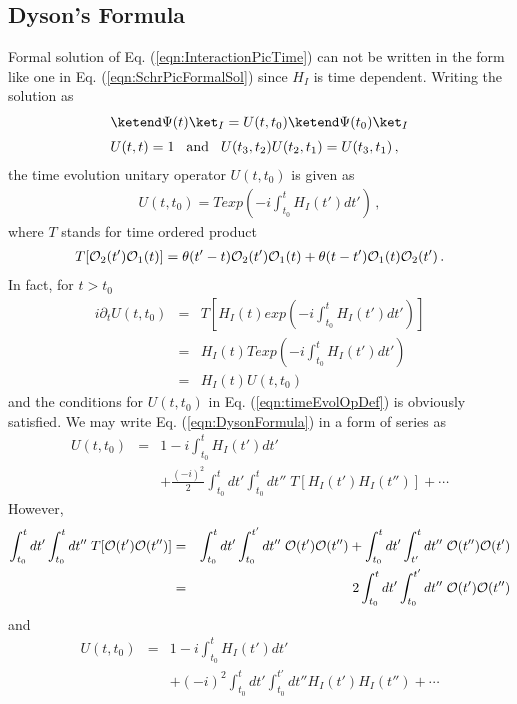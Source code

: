 \subsection{Dyson's Formula}
Formal solution of Eq. (\ref{eqn:InteractionPicTime}) 
can not be written in the form like one in Eq. (\ref{eqn:SchrPicFormalSol})
since $H_I$ is time dependent.
Writing the solution as
\begin{eqnarray}
\begin{array}{l}
\ketend \Psi(t) \ket_I
=
U(t,t_0)
\ketend \Psi(t_0) \ket_I
\vspace{2mm}
\\
U(t,t) = 1
\hspace{3mm} \mbox{and}
\hspace{3mm}
 U(t_3,t_2) U(t_2,t_1) = U(t_3,t_1) \,,
\end{array}
\label{eqn:timeEvolOpDef}
\end{eqnarray}
the time evolution unitary operator $U(t,t_0)$ is given as
\begin{eqnarray}
U(t, t_0) =
T exp \left(
-i \int_{t_0}^t H_I (t') dt'
\right)\,,
\label{eqn:DysonFormula}
\end{eqnarray}
where $T$ stands for time ordered product 
\cite{ref:Peskin-Schroeder, ref:Itzykson-Zuber, ref:NIsh.1-2, ref:Hioki, ref:Tong}
\begin{eqnarray}
T[ {\cal O}_2(t')  {\cal O}_1 (t) ]=
\theta(t' - t) {\cal O}_2(t')  {\cal O}_1 (t) +
\theta(t - t'){\cal O}_1(t)  {\cal O}_2 (t') \,.
\label{eqn:TProdDef}
\end{eqnarray}
In fact, for $t > t_0$
\begin{eqnarray}
i\partial_t U(t, t_0)
&=&
T \left[
H_I(t) 
 exp \left(
-i \int_{t_0}^t H_I (t') dt'
\right)
\right]
\nonumber\\
&=&
H_I(t) 
T exp \left(
-i \int_{t_0}^t H_I (t') dt'
\right)
\nonumber\\
&=&
H_I(t) 
U(t, t_0)
\end{eqnarray}
and the conditions for $U(t, t_0)$ in Eq. (\ref{eqn:timeEvolOpDef})
is obviously satisfied.
We may write Eq. (\ref{eqn:DysonFormula}) in a form of series as
\begin{eqnarray}
U(t, t_0) &=&
1 -i \int_{t_0}^t H_I (t') dt'
\nonumber\\
&&+
\frac{(-i)^2}{2}
\int_{t_0}^t dt'
\int_{t_0}^t dt''
\;T[ H_I (t') H_I (t'')]
+ \cdots
\label{eqn:TimeDevPerturbSerTprod}
\end{eqnarray}
However,
\begin{eqnarray*}
\int_{t_0}^t dt'
\int_{t_0}^t dt''
\;T[ {\cal O} (t') {\cal O} (t'')]
&=&
\int_{t_0}^t dt'
\int_{t_0}^{{t'}} dt''
\; {\cal O} (t') {\cal O} (t'')
+
\int_{t_0}^t dt'
\int_{t'}^t dt''
\; {\cal O} (t'') {\cal O} (t')
\nonumber\\
&=&
2
\int_{t_0}^t dt'
\int_{t_0}^{{t'}} dt''
\; {\cal O} (t') {\cal O} (t'')
\end{eqnarray*}
and
\begin{eqnarray}
U(t, t_0) &=&
1 -i \int_{t_0}^t H_I (t') dt'
\nonumber\\
&&+
(-i)^2
\int_{t_0}^t dt'
\int_{t_0}^{t'} dt''
 H_I (t') H_I (t'')
+ \cdots
\label{eqn:TimeDevOpPerturbSer}
\end{eqnarray}

